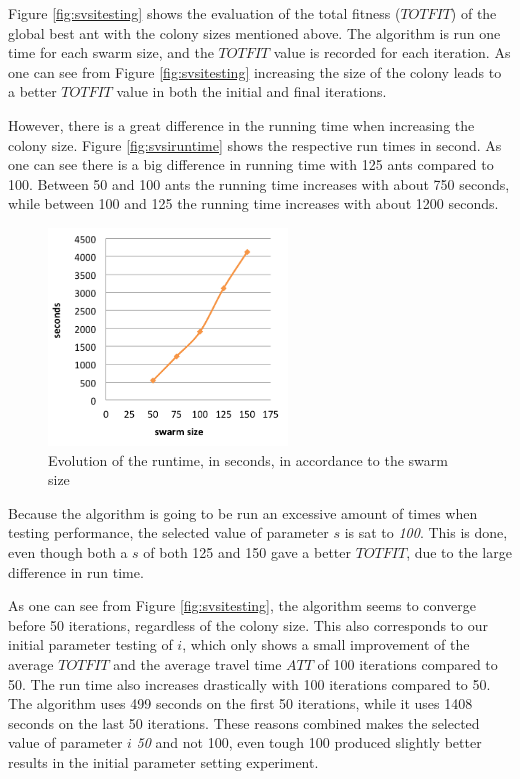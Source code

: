 Figure \vref{fig:svsitesting} shows the evaluation of the total fitness ($TOTFIT$) of the global best ant with the colony sizes mentioned above. The algorithm is run one time for each swarm size, and the $TOTFIT$ value is recorded for each iteration. As one can see from Figure \vref{fig:svsitesting} increasing the size of the colony leads to a better $TOTFIT$ value in both the initial and final iterations.  %

However, there is a great difference in the running time when increasing the colony size. Figure \vref{fig:svsiruntime} shows the respective run times in second. As one can see there is a big difference in running time with 125 ants compared to 100. Between 50 and 100 ants the running time increases with about 750 seconds, while between 100 and 125 the running time increases with about 1200 seconds. 

\begin{figure}[H]
\begin{center}
  \includegraphics[width=2.5in]{assets/svsiruntime.png}
  \end{center}
  \caption{Evolution of the runtime, in seconds, in accordance to the swarm size}
  \label{fig:svsiruntime} 
\end{figure}

Because the algorithm is going to be run an excessive amount of times when testing performance, the selected value of parameter $s$ is sat to \textit{100}. This is done, even though both a $s$ of both 125 and 150 gave a better $TOTFIT$, due to the large difference in run time. 

As one can see from Figure \vref{fig:svsitesting}, the algorithm seems to converge before 50 iterations, regardless of the colony size. This also corresponds to our initial parameter testing of $i$, which only shows a small improvement of the average $TOTFIT$ and the average travel time $ATT$ of 100 iterations compared to 50. The run time also increases drastically with 100 iterations compared to 50. The algorithm uses 499 seconds on the first 50 iterations, while it uses 1408 seconds on the last 50 iterations. These reasons combined makes the selected value of parameter $i$ \textit{50} and not 100, even tough 100 produced slightly better results in the initial parameter setting experiment.  

